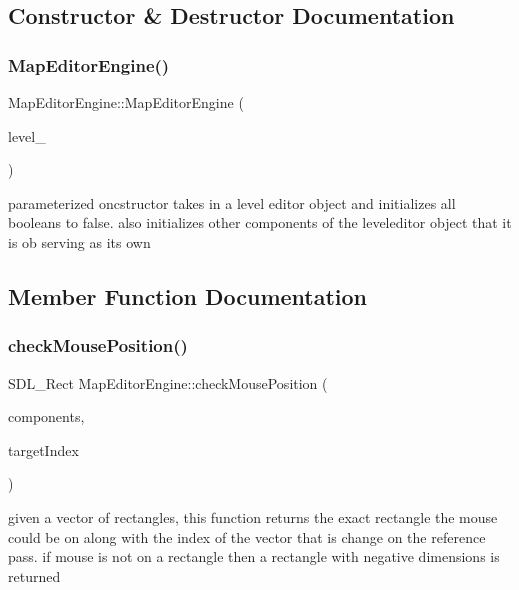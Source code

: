 \subsection{Constructor \& Destructor Documentation}
\hypertarget{class_map_editor_engine_ae709ea10e7b1a97a9178745793932ab4}{}\label{class_map_editor_engine_ae709ea10e7b1a97a9178745793932ab4} 
\subsubsection{\texorpdfstring{Map\+Editor\+Engine()}{MapEditorEngine()}}
{\footnotesize\ttfamily Map\+Editor\+Engine\+::\+Map\+Editor\+Engine (\begin{DoxyParamCaption}\item[{\hyperlink{class_level_editor}{Level\+Editor} $\ast$}]{level\+\_\+ }\end{DoxyParamCaption})}

parameterized oncstructor takes in a level editor object and initializes all booleans to false. also initializes other components of the leveleditor object that it is ob serving as its own 

\subsection{Member Function Documentation}
\hypertarget{class_map_editor_engine_ab516d7b076e7353671374bf580211989}{}\label{class_map_editor_engine_ab516d7b076e7353671374bf580211989} 
\subsubsection{\texorpdfstring{check\+Mouse\+Position()}{checkMousePosition()}}
{\footnotesize\ttfamily S\+D\+L\+\_\+\+Rect Map\+Editor\+Engine\+::check\+Mouse\+Position (\begin{DoxyParamCaption}\item[{std\+::vector$<$ S\+D\+L\+\_\+\+Rect $>$}]{components,  }\item[{int $\ast$}]{target\+Index }\end{DoxyParamCaption})}

given a vector of rectangles, this function returns the exact rectangle the mouse could be on along with the index of the vector that is change on the reference pass. if mouse is not on a rectangle then a rectangle with negative dimensions is returned \hypertarget{class_map_editor_engine_a1e66d4cb755d33fb9ca29d6fa80b544a}{}\label{class_map_editor_engine_a1e66d4cb755d33fb9ca29d6fa80b544a} 
